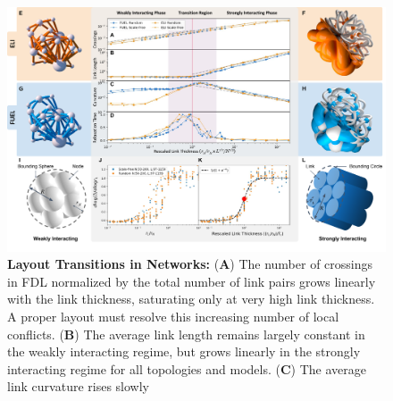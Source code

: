\documentclass[endfloats,nofootinbib,preprint,floatfix,titlepage,superscriptaddress,linenumbers]{revtex4-1} %
\begin{document}
\begin{figure}
\centering
\includegraphics[width = \textwidth,trim=1cm 0cm 0cm 0cm]{fig-09-19/3d-phase-compare-050218.pdf}
\caption{%
    \scriptsize {\bf Layout Transitions in Networks:} %
    ({\bf A}) The number of crossings in FDL normalized by the total number of link pairs grows linearly with the link thickness, saturating only at very high link thickness. 
    A proper layout must resolve this increasing number of local conflicts.    ({\bf B}) The average link length remains largely constant in the weakly interacting regime, but grows linearly in the strongly interacting regime for all topologies and models.
    { ({\bf C}) The average link curvature rises slowly %
}}
\end{figure}
\end{document}
